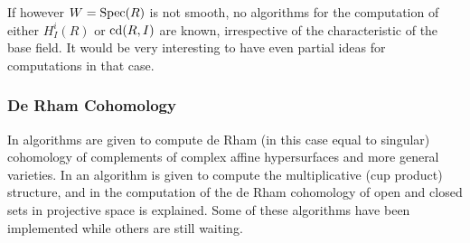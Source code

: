 If however $W=\operatorname{Spec}(R)$ is not smooth, no algorithms for the computation of
either $H^i_I(R)$ or $\operatorname{cd}(R,I)$ are known, irrespective of the
characteristic of the base field. It would be very interesting to have
even partial ideas for computations in that case.
\subsubsection{De Rham Cohomology} In \cite{DM:O-T1,DM:W2} algorithms are given
 to compute de Rham (in this case equal to singular) 
cohomology of complements of complex affine
hypersurfaces and more general varieties. In \cite{DM:W3} an algorithm
is given to compute the multiplicative (cup product) structure, and in
\cite{DM:W4} the computation of the de Rham cohomology of open and
closed sets in projective
space is explained. Some of these
algorithms have been implemented while others are still waiting. 

